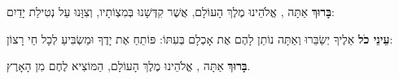 
\label{netilat-yadayim}

\textbf{בָּרוּךְ} אַתָּה \Shem{}, אֱלֹהֵינוּ מֶלֶךְ הָעוֹלָם, אֲשֶׁר קִדְּשָׁנוּ בְּמִצְוֹתָיו, וְצִוָּנוּ עַל נְטִילַת יָדַיִם:

\divider


\textbf{עֵינֵי כֹל} אֵלֶיךָ יְשַׂבֵּרוּ וְאַתָּה נוֹתֵן לָהֶם אֶת אָכְלָם בְּעִתּוֹ: פּוֹתֵחַ אֶת יָדֶךָ וּמַשְׂבִּיעַ לְכָל חַי רָצוֹן:

\textbf{בָּרוּךְ} אַתָּה \Shem{}, אֱלֹהֵינוּ מֶלֶךְ הָעוֹלָם, הַמּוֹצִיא לֶחֶם מִן הָאָרֶץ.

